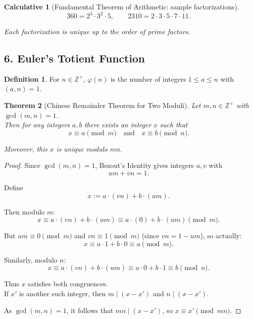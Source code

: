 \documentclass[12pt]{article}
\newtheorem{theorem}{Theorem}
\newtheorem{calculative}[theorem]{Calculative}
\theoremstyle{definition}
\newtheorem{definition}{Definition}
\begin{document}
\dotfill

\begin{calculative}[Fundamental Theorem of Arithmetic: sample factorizations]

\[
360=2^3\cdot 3^2\cdot 5,\qquad 2310=2\cdot 3\cdot 5\cdot 7\cdot 11.
\]

\noindent
Each factorization is unique up to the order of prime factors.
\end{calculative}


\newpage

\subsection*{6. Euler's Totient Function}

\begin{definition}
For $n\in\mathbb{Z}^+$, $\varphi(n)$ is the number of integers $1\le a\le n$ with $(a,n)=1$.
\end{definition}

\dotfill

\begin{theorem}[Chinese Remainder Theorem for Two Moduli]
Let $m,n \in \mathbb{Z}^+$ with $\gcd(m,n)=1$.\\

Then for any integers $a,b$ there exists an integer $x$ such that
\[
x \equiv a \pmod{m} \quad\text{and}\quad x \equiv b \pmod{n}.
\]

Moreover, this $x$ is unique modulo $mn$.
\end{theorem}

\vspace{1em}

\begin{proof}
Since $\gcd(m,n)=1$, Bezout's Identity gives integers $u,v$ with
\[
um + vn = 1.
\]

\noindent
Define
\[
x := a \cdot (vn) + b \cdot (um).
\]

\noindent
Then modulo $m$:
\[
x \equiv a\cdot(vn) + b\cdot(um) \equiv a\cdot(0) + b\cdot(um) \pmod{m}.
\]

\noindent
But $um \equiv 0 \pmod{m}$ and $vn \equiv 1 \pmod{m}$ (since $vn = 1 - um$), so actually:
\[
x \equiv a\cdot 1 + b\cdot 0 \equiv a \pmod{m}.
\]

\noindent
Similarly, modulo $n$:
\[
x \equiv a\cdot(vn) + b\cdot(um) \equiv a\cdot 0 + b\cdot 1 \equiv b \pmod{n}.
\]

\noindent
Thus $x$ satisfies both congruences.\\

\noindent
If $x'$ is another such integer, then $m\mid(x-x')$ and $n\mid(x-x')$. 

\noindent
As $\gcd(m,n)=1$, it follows that $mn\mid(x-x')$, so $x\equiv x' \pmod{mn}$.
\end{proof}
\end{document}
